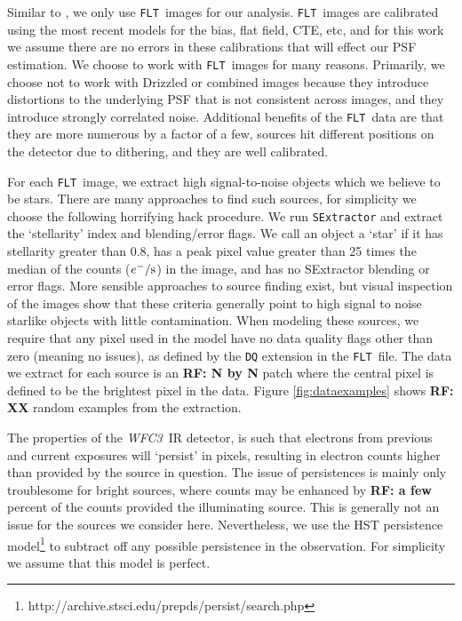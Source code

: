 \documentclass[12pt,letterpaper,preprint]{aastex}
\newcommand{\instrument}[1]{\textsl{#1}}
\newcommand{\rf}[1]{\textbf{RF: #1}}
\newcommand{\WFC}{\instrument{WFC3}}
\newcommand{\FLT}{\texttt{FLT}}
\begin{document}
Similar to \citet{anderson06}, we only use \FLT\ images for our analysis.  \FLT\ images are calibrated 
using the most recent models for the bias, flat field, CTE, etc, and for this work we assume there are 
no errors in these calibrations that will effect our PSF estimation.  We choose to work with \FLT\
images for many reasons.  Primarily, we choose not to work with Drizzled or combined images
because they introduce distortions to the underlying PSF that is not consistent across images, and 
they introduce strongly correlated noise.  Additional benefits of the \FLT\ data are that they are 
more numerous by a factor of a few, sources hit different positions on the detector due to dithering, 
and they are well calibrated.  

For each \FLT\ image, we extract high signal-to-noise objects which we believe to be stars.  There 
are many approaches to find such sources, for simplicity we choose the following horrifying hack 
procedure.  We run \texttt{SExtractor} \citep{bertin} and extract the `stellarity' index and blending/error 
flags.  We call an object a `star' if it has stellarity greater than 0.8, has a peak pixel value greater than 25
times the median of the counts ($e^- / \rm{s}$) in the image, and has no SExtractor blending or 
error flags.  More sensible approaches to source finding exist, but visual inspection of the images 
show that these criteria generally point to high signal to noise starlike objects with little contamination.
When modeling these sources, we require that any pixel used in the model have no data quality 
flags other than zero (meaning no issues), as defined by the \texttt{DQ} extension in the \FLT\ file.  
The data we extract for each source is an \rf{N by N} patch where the central pixel is defined to be the 
brightest pixel in the data.  Figure \ref{fig:dataexamples} shows \rf{XX} random examples from the 
extraction.

The properties of the \WFC\ IR detector, is such that electrons from previous and current exposures 
will `persist' in pixels, resulting in electron counts higher than provided by the source in question.  
The issue of persistences is mainly only troublesome for bright sources, where counts may be 
enhanced by \rf{a few} percent of the counts provided the illuminating source.  This is generally 
not an issue for the sources we consider here.  Nevertheless, we use the HST persistence 
model\footnote{http://archive.stsci.edu/prepds/persist/search.php} to subtract off any possible 
persistence in the observation.  For simplicity we assume that this model is perfect.
\end{document}
